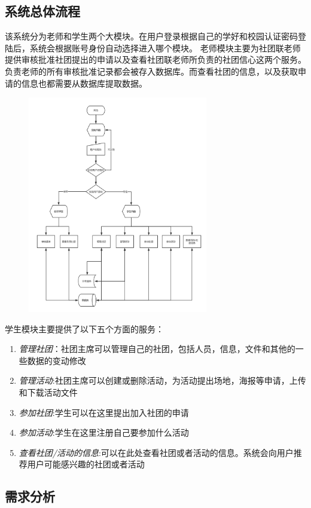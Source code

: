 \documentclass[UTF8]{ctexart}
\begin{document}
\subsection{系统总体流程}
该系统分为老师和学生两个大模块。在用户登录根据自己的学好和校园认证密码登陆后，系统会根据账号身份自动选择进入哪个模块。
老师模块主要为社团联老师提供审核批准社团提出的申请以及查看社团联老师所负责的社团信心这两个服务。负责老师的所有审核批准记录都会被存入数据库。而查看社团的信息，以及获取申请的信息也都需要从数据库提取数据。\\
\begin{figure}[H]
\centering
\includegraphics[width = 0.7\textwidth]{软工系统流程图.png}
\end{figure}
学生模块主要提供了以下五个方面的服务：
\begin{enumerate}[1)]
\item \emph{管理社团}：社团主席可以管理自己的社团，包括人员，信息，文件和其他的一些数据的变动修改
\item \emph{管理活动}:社团主席可以创建或删除活动，为活动提出场地，海报等申请，上传和下载活动文件
\item \emph{参加社团}:学生可以在这里提出加入社团的申请
\item \emph{参加活动}:学生在这里注册自己要参加什么活动
\item \emph{查看社团/活动的信息}:可以在此处查看社团或者活动的信息。系统会向用户推荐用户可能感兴趣的社团或者活动
\end{enumerate}

\subsection{需求分析}
\end{document}
